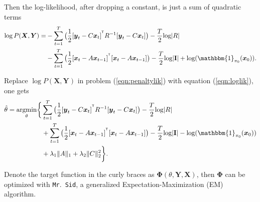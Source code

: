 \documentclass[fleqn,12pt]{article}
\let\oldref\ref
\renewcommand{\ref}[1]{(\oldref{#1})}
\newcommand{\T}{^{\ensuremath{\mathsf{T}}}}           %
\newcommand{\mrsid}{{\sc \texttt{Mr}.~\texttt{Sid}}}
\newcommand{\argmin}{\operatornamewithlimits{argmin}}
\providecommand{\mb}[1]{\boldsymbol{#1}}
\newcommand{\bx}{\mb{x}}
\newcommand{\by}{\mb{y}}
\newcommand{\bX}{\mb{X}}
\newcommand{\bY}{\mb{Y}}
\begin{document}
Then the log-likelihood, after dropping a constant, is just a sum of quadratic terms
\begin{equation}\label{eqn:loglik}
\begin{split}
\log  P(\bX,\bY)=&-\sum\limits_{t=1}^{T}\big(\frac{1}{2}[\by_t-C\bx_t]^{\T}R^{-1}[\by_t-C\bx_t]\big)-\frac{T}{2}\text{log}|R|\\
&-\sum\limits_{t=1}^{T}\big(\frac{1}{2}[\bx_t-A\bx_{t-1}]^{\T}[\bx_t-A\bx_{t-1}]\big)-\frac{T}{2}\text{log}|\mathbf{I}|+ \text{log}(\mathbbm{1}_{\mathbf{\pi}_0}(\bx_0)).
\end{split}
\end{equation}

Replace $\log  P(\bX,\bY)$ in problem \ref{eqn:penaltylik} with equation \ref{eqn:loglik}, one gets
\begin{equation}\label{eqn:penaltylik2}
\begin{split}
\hat{\theta}=\argmin_{\substack{\theta}}\biggl\{&\sum\limits_{t=1}^{T}\big(\frac{1}{2}[\by_t-C\bx_t]^{\T}R^{-1}[\by_t-C\bx_t]\big)-\frac{T}{2}\text{log}|R|\\
&+\sum\limits_{t=1}^{T}\big(\frac{1}{2}[\bx_t-A\bx_{t-1}]^{\T}[\bx_t-A\bx_{t-1}]\big)-\frac{T}{2}\text{log}|\mathbf{I}| - \text{log}(\mathbbm{1}_{\mathbf{\pi}_0}(\bx_0))\\
&+\lambda_1\|A\|_1+\lambda_2\|C\|_2^2\biggr\}.
\end{split}
\end{equation}

Denote the target function in the curly braces  as $\mathbf{\Phi}(\theta,\bY,\bX)$, then $\mathbf{\Phi}$ can be optimized with \mrsid, a generalized Expectation-Maximization (EM) algorithm.
\end{document}
